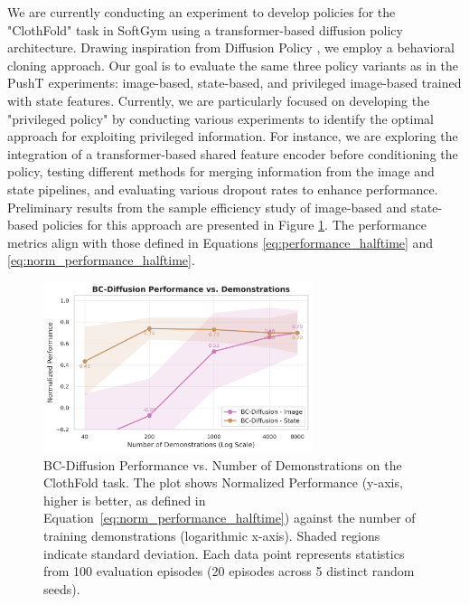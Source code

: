 \documentclass{article}
\begin{document}
We are currently conducting an experiment to develop policies for the "ClothFold" task in SoftGym \cite{lin2021softgym} using a transformer-based diffusion policy architecture.
Drawing inspiration from Diffusion Policy \cite{chi2023diffusionpolicy}, we employ a behavioral cloning approach.
Our goal is to evaluate the same three policy variants as in the PushT experiments: image-based, state-based, and privileged image-based trained with state features.
Currently, we are particularly focused on developing the "privileged policy" by conducting various experiments to identify the optimal approach for exploiting privileged information.
For instance, we are exploring the integration of a transformer-based shared feature encoder before conditioning the policy, testing different methods for merging information from the image and state pipelines, and evaluating various dropout rates to enhance performance.
Preliminary results from the sample efficiency study of image-based and state-based policies for this approach are presented in Figure \ref{fig:bcdiff_clothfold_efficiency}. The performance metrics align with those defined in Equations \eqref{eq:performance_halftime} and \eqref{eq:norm_performance_halftime}.

\begin{figure}[htbp]
    \centering
    \includegraphics[width=0.7\textwidth]{./media/bc_diffusion_performance_vs_num_dems.png}
    \caption{BC-Diffusion Performance vs. Number of Demonstrations on the ClothFold task. The plot shows Normalized Performance (y-axis, higher is better, as defined in Equation~\eqref{eq:norm_performance_halftime}) against the number of training demonstrations (logarithmic x-axis). Shaded regions indicate standard deviation. Each data point represents statistics from 100 evaluation episodes (20 episodes across 5 distinct random seeds).}
    \label{fig:bcdiff_clothfold_efficiency}
\end{figure}
\end{document}
